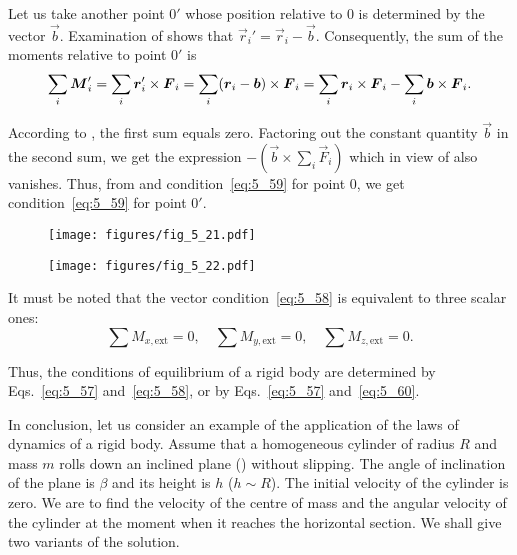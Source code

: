 \noindent
Let us take another point $0'$ whose position relative to $0$ is determined by the vector $\vec{b}$. Examination of  shows that $\vec{r}_i'=\vec{r}_i-\vec{b}$. Consequently, the sum of the moments relative to point $0'$ is
\begin{equation*}
	\sum_i\boldsymbol{M}_{i}' = \sum_i \boldsymbol{r}_i'\times\boldsymbol{F}_i = \sum_i (\boldsymbol{r}_i-\boldsymbol{b})\times\boldsymbol{F}_i = \sum_i\boldsymbol{r}_{i}\times\boldsymbol{F}_{i} - \sum_i\boldsymbol{b}\times\boldsymbol{F}_i.
\end{equation*}

\noindent
According to , the first sum equals zero. Factoring out the constant quantity $\vec{b}$ in the second sum, we get the expression $-\left(\vec{b}\times\sum_i\vec{F}_i\right)$ which in view of  also vanishes. Thus, from  and condition~\eqref{eq:5_59} for point $0$, we get condition~\eqref{eq:5_59} for point $0'$.

\begin{figure}[t]
	\begin{minipage}[t]{0.27\linewidth}
		\begin{center}
			\texttt{[image: figures/fig\_5\_21.pdf]}
			\caption[]{}
			\label{fig:5_21}
		\end{center}
	\end{minipage}
	\hspace{-0.05cm}
	\begin{minipage}[t]{0.7\linewidth}
		\begin{center}
			\texttt{[image: figures/fig\_5\_22.pdf]}
			\caption[]{}
			\label{fig:5_22}
		\end{center}
	\end{minipage}
	\vspace{-0.7cm}
\end{figure}

It must be noted that the vector condition~\eqref{eq:5_58} is equivalent to three scalar ones:
\begin{equation}\label{eq:5_60}
	\sum M_{x,\text{ext}} = 0 ,\quad \sum M_{y,\text{ext}} = 0 ,\quad \sum M_{z,\text{ext}} = 0.
\end{equation}

Thus, the conditions of equilibrium of a rigid body are determined by Eqs.~\eqref{eq:5_57} and~\eqref{eq:5_58}, or by Eqs.~\eqref{eq:5_57} and~\eqref{eq:5_60}.

In conclusion, let us consider an example of the application of the laws of dynamics of a rigid body. Assume that a homogeneous cylinder of radius $R$ and mass $m$ rolls down an inclined plane () without slipping. The angle of inclination of the plane is $\beta$ and its height is $h$ ($h\sim R$). The initial velocity of the cylinder is zero. We are to find the velocity of the centre of mass and the angular velocity of the cylinder at the moment when it reaches the horizontal section. We shall give two variants of the solution.

